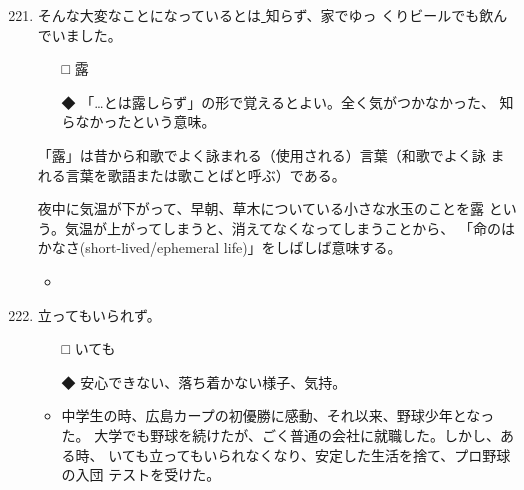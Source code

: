 \documentclass[
uplatex,
b5paper,
10pt,
dvipdfmx
]{jsbook}
\begin{document}
\begin{enumerate}
\setcounter{enumi}{220}
\setcounter{footnote}{0}

 \item そんな大変なことになっているとは\underline{   }知らず、家でゆっ
       くりビールでも飲んでいました。

 \begin{itemize}
  \item[□] 露
  \item[◆] 「…とは露しらず」の形で覚えるとよい。全く気がつかなかった、
       知らなかったという意味。
 \end{itemize}

       「露」は昔から和歌でよく詠まれる（使用される）言葉（和歌でよく詠
       まれる言葉を歌語または歌ことばと呼ぶ）である。

       夜中に気温が下がって、早朝、草木についている小さな水玉のことを露
       という。気温が上がってしまうと、消えてなくなってしまうことから、
       「命のはかなさ(short-lived/ephemeral life)」をしばしば意味する。

 \begin{itemize}
  \item 
 \end{itemize}

 \item \underline{   }立ってもいられず。 

 \begin{itemize}
  \item[□] いても
  \item[◆] 安心できない、落ち着かない様子、気持。
 \end{itemize}

 \begin{itemize}
  \item 中学生の時、広島カープの初優勝に感動、それ以来、野球少年となった。
	大学でも野球を続けたが、ごく普通の会社に就職した。しかし、ある時、
	いても立ってもいられなくなり、安定した生活を捨て、プロ野球の入団
	テストを受けた。
 \end{itemize}


\end{enumerate}
\end{document}
